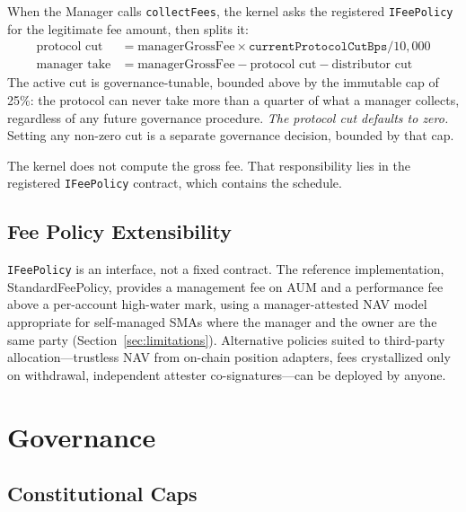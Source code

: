 \documentclass[11pt]{article}
\begin{document}
When the Manager calls \texttt{collectFees}, the kernel asks the registered \texttt{IFeePolicy} for the legitimate fee amount, then splits it:
\begin{align*}
\text{protocol cut} &= \text{managerGrossFee} \times \texttt{currentProtocolCutBps} / 10{,}000\\
\text{manager take} &= \text{managerGrossFee} - \text{protocol cut} - \text{distributor cut}
\end{align*}
The active cut is governance-tunable, bounded above by the immutable cap of 25\%: the protocol can never take more than a quarter of what a manager collects, regardless of any future governance procedure. \emph{The protocol cut defaults to zero.} Setting any non-zero cut is a separate governance decision, bounded by that cap.

The kernel does not compute the gross fee. That responsibility lies in the registered \texttt{IFeePolicy} contract, which contains the schedule.

\subsection{Fee Policy Extensibility}

\texttt{IFeePolicy} is an interface, not a fixed contract. The reference implementation, StandardFeePolicy, provides a management fee on AUM and a performance fee above a per-account high-water mark, using a manager-attested NAV model appropriate for self-managed SMAs where the manager and the owner are the same party (Section~\ref{sec:limitations}). Alternative policies suited to third-party allocation---trustless NAV from on-chain position adapters, fees crystallized only on withdrawal, independent attester co-signatures---can be deployed by anyone.

\section{Governance}
\label{sec:governance}

\subsection{Constitutional Caps}
\end{document}
